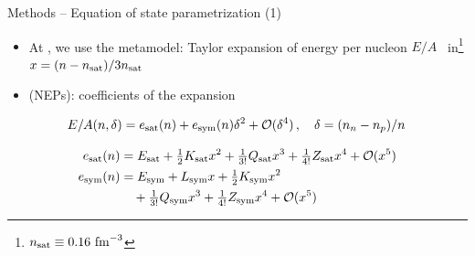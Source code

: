 \documentclass[usenames,dvipsnames,t]{beamer}
\begin{document}
\begin{frame}{Methods -- Equation of state parametrization (1)}

  \def\x{3mm}
    
  \begin{itemize}
    \item At , we use the metamodel: Taylor expansion of energy per nucleon $E/A$~\cite{Margueron:2017eqc,Margueron:2017lup} in\footnote{$n_{\rm{sat}} \equiv 0.16 \ \rm{fm}^{-3}$} $x = (n - n_{\rm{sat}}) / 3n_{\rm{sat}}$

    \vspace{\x}

    \item {} (NEPs): coefficients of the expansion
  \end{itemize}

  \vspace{\x}

  \begin{equation*}
    E/A(n, \delta) = e_{\rm{sat}}(n) + e_{\rm{sym}}(n) \delta^2  + \mathcal{O}(\delta^4) \, , \quad \delta = (n_n - n_p) / n \,
  \end{equation*}

  \begin{align*}
    e_{\rm{sat}}(n) &= E_{\rm{sat}} + \tfrac12 K_{\rm{sat}} x^2 + \tfrac{1}{3!} Q_{\rm{sat}} x^3 + \tfrac{1}{4!} Z_{\rm{sat}} x^4 + \mathcal{O}(x^5) \\
    e_{\rm{sym}}(n) &= E_{\rm{sym}} + L_{\rm{sym}} x + \tfrac12 K_{\rm{sym}} x^2  \\
    & \quad + \tfrac{1}{3!} Q_{\rm{sym}} x^3 + \tfrac{1}{4!} Z_{\rm{sym}} x^4 + \mathcal{O}(x^5)
  \end{align*}

\end{frame}
\end{document}
